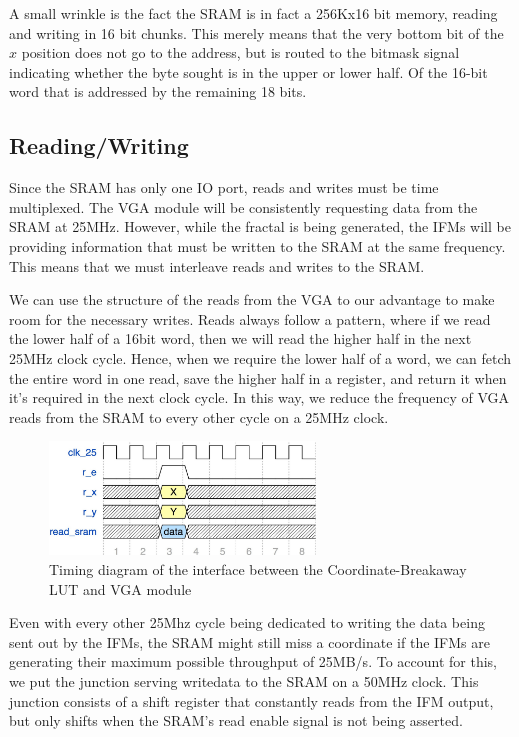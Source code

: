 \documentclass{article}
\begin{document}
A small wrinkle is the fact the SRAM is in fact a 256Kx16 bit memory,
reading and writing in 16 bit chunks. This merely means that the very
bottom bit of the $x$ position does not go to the address, but is
routed to the bitmask signal indicating whether the byte sought is in
the upper or lower half.  Of the 16-bit word that is addressed by the
remaining 18 bits.

\subsection{Reading/Writing}

Since the SRAM has only one IO port, reads and writes must be time
multiplexed. The VGA module will be consistently requesting data from
the SRAM at 25MHz. However, while the fractal is being generated, the
IFMs will be providing information that must be written to the SRAM at
the same frequency. This means that we must interleave reads and
writes to the SRAM.

We can use the structure of the reads from the VGA to our advantage to
make room for the necessary writes. Reads always follow a pattern,
where if we read the lower half of a 16bit word, then we will read the
higher half in the next 25MHz clock cycle. Hence, when we require the
lower half of a word, we can fetch the entire word in one read, save
the higher half in a register, and return it when it's required in the
next clock cycle. In this way, we reduce the frequency of VGA reads
from the SRAM to every other cycle on a 25MHz clock.

\begin{figure}[H]
  \centering
    \includegraphics[width=200pt]{timing_diagrams/clut_vga.pdf}
  \caption{Timing diagram of the interface between the
    Coordinate-Breakaway LUT and VGA module}
\end{figure}

Even with every other 25Mhz cycle being dedicated to writing the data
being sent out by the IFMs, the SRAM might still miss a coordinate if
the IFMs are generating their maximum possible throughput of
25MB/s. To account for this, we put the junction serving writedata to
the SRAM on a 50MHz clock. This junction consists of a shift register
that constantly reads from the IFM output, but only shifts when the
SRAM's read enable signal is not being asserted.
\end{document}
